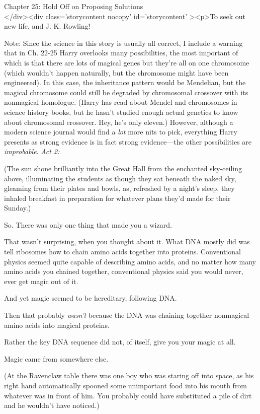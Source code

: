 
Chapter 25: Hold Off on Proposing Solutions\\
</div><div  class='storycontent nocopy' id='storycontent' ><p>To seek out new 
life, and J. K. Rowling!

Note: Since the science in this story is usually all correct, I include a 
warning that in Ch. 22-25 Harry overlooks many possibilities, the most 
important of which is that there are lots of magical genes but they're all on 
one chromosome (which wouldn't happen naturally, but the chromosome might have 
been engineered). In this case, the inheritance pattern would be Mendelian, but 
the magical chromosome could still be degraded by chromosomal crossover with 
its nonmagical homologue. (Harry has read about Mendel and chromosomes in 
science history books, but he hasn't studied enough actual genetics to know 
about chromosomal crossover. Hey, he's only eleven.) However, although a modern 
science journal would find a \emph{lot} more nits to pick, everything Harry 
presents as strong evidence is in fact strong evidence---the other 
possibilities are \emph{improbable}.
\sbreak
\emph{Act 2:}

(The sun shone brilliantly into the Great Hall from the enchanted sky-ceiling 
above, illuminating the students as though they sat beneath the naked sky, 
gleaming from their plates and bowls, as, refreshed by a night's sleep, they 
inhaled breakfast in preparation for whatever plans they'd made for their 
Sunday.)

So. There was only one thing that made you a wizard.

That wasn't surprising, when you thought about it. What DNA mostly did was tell 
ribosomes how to chain amino acids together into proteins. Conventional physics 
seemed quite capable of describing amino acids, and no matter how many amino 
acids you chained together, conventional physics said you would never, ever get 
magic out of it.

And yet magic seemed to be hereditary, following DNA.

Then that probably\emph{ wasn't} because the DNA was chaining together 
nonmagical amino acids into magical proteins.

Rather the key DNA sequence did not, of itself, give you your magic at all.

Magic came from somewhere else.

(At the Ravenclaw table there was one boy who was staring off into space, as 
his right hand automatically spooned some unimportant food into his mouth from 
whatever was in front of him. You probably could have substituted a pile of 
dirt and he wouldn't have noticed.)

